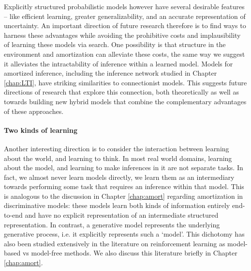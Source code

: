Explicitly structured probabilistic models however have several desirable features -- like efficient learning\citep{kemp2007learning}, greater generalizability\citep{lake2017building}, and an accurate representation of uncertainty\citep{hacking2006emergence}. An important direction of future research therefore is to find ways to harness these advantages while avoiding the prohibitive costs and implausibility of learning these models via search. One possibility is that structure in the environment and amortization can alleviate these costs, the same way we suggest it alleviates the intractability of inference within a learned model. Models for amortized inference, including the inference network studied in Chapter \ref{chap:LTI}, have striking similarities to connectionist models. This suggests future directions of research that explore this connection, both theoretically as well as towards building new hybrid models that combine the complementary advantages of these approaches.


\paragraph{Two kinds of learning}

Another interesting direction is to consider the interaction between learning about the world, and learning to think. In most real world domains, learning about the model, and learning to make inferences in it are not separate tasks. In fact, we almost never learn models directly, we learn them as an intermediary towards performing some task that requires an inference within that model. This is analogous to the discussion in Chapter \ref{chap:amort} regarding amortization in discriminative models: these models learn both kinds of information entirely end-to-end and have no explicit representation of an intermediate structured representation. In contrast, a generative model represents the underlying generative process, i.e. it explicitly represents such a `model'. This dichotomy has also been studied extensively in the literature on reinforcement learning as model-based vs model-free methods. We also discuss this literature briefly in Chapter \ref{chap:amort}.

